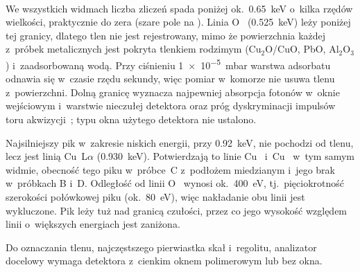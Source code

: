\paragraph{}
\label{sec:widma-tlen}

We wszystkich widmach liczba zliczeń spada poniżej ok.~\SI{0.65}{\kilo\electronvolt}
o~kilka rzędów wielkości, praktycznie do zera
(szare pole na ). Linia O~\Ka{} (\SI{0.525}{\kilo\electronvolt})
leży poniżej tej granicy, dlatego tlen nie jest rejestrowany, mimo że powierzchnia
każdej z~próbek metalicznych jest pokryta tlenkiem rodzimym (Cu$_2$O/CuO, PbO, Al$_2$O$_3$)
i~zaadsorbowaną wodą. Przy ciśnieniu \SI{1e-5}{\milli\bar} warstwa adsorbatu
odnawia się w~czasie rzędu sekundy, więc pomiar w~komorze nie usuwa tlenu
z~powierzchni. Dolną granicę wyznacza najpewniej absorpcja fotonów w~oknie wejściowym
i~warstwie nieczułej detektora oraz próg dyskryminacji impulsów toru
akwizycji~\cite{goldstein2018sem}; typu okna użytego detektora nie ustalono.

Najsilniejszy pik w~zakresie niskich energii, przy \SI{0.92}{\kilo\electronvolt},
nie pochodzi od tlenu, lecz jest linią Cu~L$\alpha$ (\SI{0.930}{\kilo\electronvolt}).
Potwierdzają to linie Cu~\Ka{} i~Cu~\Kb{} w~tym samym widmie, obecność tego piku
w~próbce~C z~podłożem miedzianym i~jego brak w~próbkach B i~D. Odległość od
linii O~\Ka{} wynosi ok.~\SI{400}{\electronvolt}, tj.~pięciokrotność szerokości
połówkowej piku (ok.~\SI{80}{\electronvolt}), więc nakładanie obu linii jest
wykluczone. Pik leży tuż nad granicą czułości, przez co jego wysokość względem
linii o~większych energiach jest zaniżona.

Do oznaczania tlenu, najczęstszego pierwiastka skał i~regolitu, analizator
docelowy wymaga detektora z~cienkim oknem polimerowym lub bez okna.
